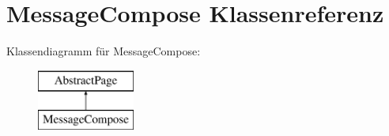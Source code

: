\hypertarget{class_message_compose}{}\section{Message\+Compose Klassenreferenz}
\label{class_message_compose}
Klassendiagramm für Message\+Compose\+:\begin{figure}[H]
\begin{center}
\leavevmode
\includegraphics[height=2.000000cm]{class_message_compose}
\end{center}
\end{figure}
